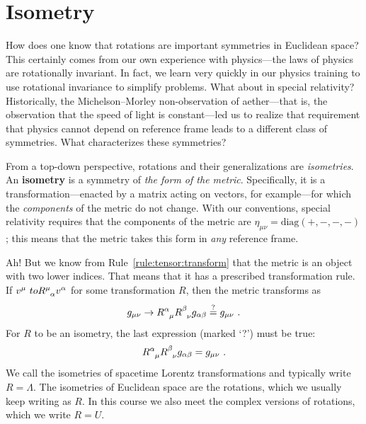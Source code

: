 \documentclass[12pt, oneside]{report}    %
\let\oldsection\section
\def\section{%
  \setcounter{sidenote}{1}%
  \oldsection
}
\begin{document}
\section{Isometry}

How does one know that rotations are important symmetries in Euclidean space? This certainly comes from our own experience with physics---the laws of physics are rotationally invariant. In fact, we learn very quickly in our physics training to use rotational invariance to simplify problems. What about in special relativity? Historically, the Michelson--Morley non-observation of aether---that is, the observation that the speed of light is constant---led us to realize that requirement that physics cannot depend on reference frame leads to a different class of symmetries. What characterizes these symmetries?

From a top-down perspective, rotations and their generalizations are \emph{isometries}. An \textbf{isometry} is a symmetry of \emph{the form of the metric}. Specifically, it is a transformation---enacted by a matrix acting on vectors, for example---for which the \emph{components} of the metric do not change. With our conventions, special relativity requires that the components of the metric are $\eta_{\mu\nu} = \text{diag}(+,-,-,-)$; this means that the metric takes this form in \emph{any} reference frame. 

Ah! But we know from Rule~\ref{rule:tensor:transform} that the metric is an object with two lower indices. That means that it has a prescribed transformation rule. If $v^\mu \ to R\aij{\mu}{\alpha}v^\alpha$ for some transformation $R$, then the metric transforms as
\begin{align}
  g_{\mu\nu} \to   R\aij{\alpha}{\mu} R\aij{\beta}{\nu} g_{\alpha\beta} \stackrel{?}{=} g_{\mu\nu} \ .
\end{align}
For $R$ to be an isometry, the last expression (marked `?') must be true:
\begin{align}
    R\aij{\alpha}{\mu} R\aij{\beta}{\nu} g_{\alpha\beta} = g_{\mu\nu} \ .
    \label{eq:defining:isometry}
\end{align}
We call the isometries of spacetime Lorentz transformations and typically write $R=\Lambda$. The isometries of Euclidean space are the rotations, which we usually keep writing as $R$. In this course we also meet the complex versions of rotations, which we write $R=U$.
\end{document}
